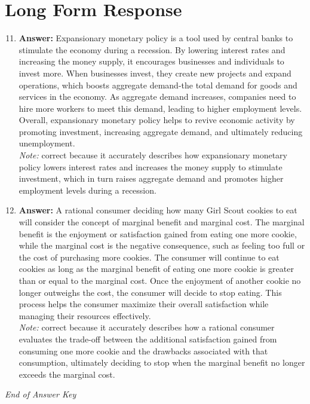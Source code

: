 \documentclass[12pt]{article}
\begin{document}
\section*{Long Form Response}
\begin{enumerate}[label=\arabic*.]
\setcounter{enumi}{10}
\item \textbf{Answer:} Expansionary monetary policy is a tool used by central banks to stimulate the economy during a recession. By lowering interest rates and increasing the money supply, it encourages businesses and individuals to invest more. When businesses invest, they create new projects and expand operations, which boosts aggregate demand-the total demand for goods and services in the economy. As aggregate demand increases, companies need to hire more workers to meet this demand, leading to higher employment levels. Overall, expansionary monetary policy helps to revive economic activity by promoting investment, increasing aggregate demand, and ultimately reducing unemployment.
\\ \textit{Note:} correct because it accurately describes how expansionary monetary policy lowers interest rates and increases the money supply to stimulate investment, which in turn raises aggregate demand and promotes higher employment levels during a recession.
\item \textbf{Answer:} A rational consumer deciding how many Girl Scout cookies to eat will consider the concept of marginal benefit and marginal cost. The marginal benefit is the enjoyment or satisfaction gained from eating one more cookie, while the marginal cost is the negative consequence, such as feeling too full or the cost of purchasing more cookies. The consumer will continue to eat cookies as long as the marginal benefit of eating one more cookie is greater than or equal to the marginal cost. Once the enjoyment of another cookie no longer outweighs the cost, the consumer will decide to stop eating. This process helps the consumer maximize their overall satisfaction while managing their resources effectively.
\\ \textit{Note:} correct because it accurately describes how a rational consumer evaluates the trade-off between the additional satisfaction gained from consuming one more cookie and the drawbacks associated with that consumption, ultimately deciding to stop when the marginal benefit no longer exceeds the marginal cost.
\end{enumerate}

\vfill
\noindent\textit{End of Answer Key}
\end{document}
